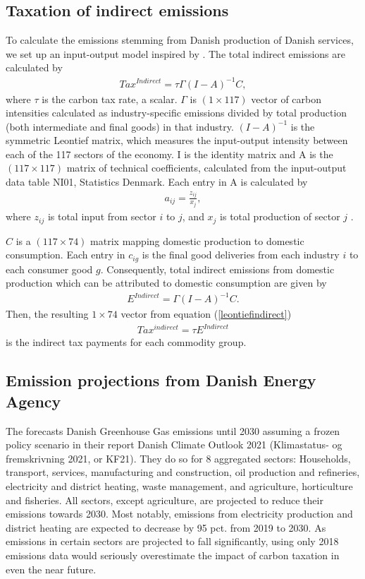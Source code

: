 \subsection{Taxation of indirect emissions}\label{secindirecttax}
To calculate the emissions stemming from Danish production of Danish services, we set up an input-output model inspired by \cite{Wier2005}. The total indirect emissions are calculated by 
\begin{align} 
\label{leontiefindirect}
    Tax^{Indirect} = \tau \Gamma (I-A)^{-1} C,
\end{align}
where $\tau$ is the carbon tax rate, a scalar. $\Gamma$ is $(1 \times 117)$ vector of carbon intensities calculated as industry-specific emissions divided by total production (both intermediate and final goods) in that industry.
$(I-A)^{-1}$ is the symmetric Leontief matrix, which measures the input-output intensity between each of the 117 sectors of the economy. I is the identity matrix and A is the $(117 \times 117)$ matrix of technical coefficients, calculated from the  input-output data table NI01, Statistics Denmark. Each entry in A is calculated by
\begin{align}
    a_{ij} = \frac{z_{ij}}{x_{j}}, 
\end{align}
where $z_{ij}$ is total input from sector $i$ to $j$, and $x_j$ is total production of sector $j$ \citep{miller_blair_2009}.

$C$ is a  $(117 \times 74)$  matrix mapping domestic production to domestic consumption. Each entry in $c_{ig}$ is the final good deliveries from each industry $i$ to each consumer good $g$. Consequently, total indirect emissions from domestic production which can be attributed to domestic consumption are given by
\begin{align}
    E^{Indirect} = \Gamma (I-A)^{-1} C.
\end{align}
Then, the resulting $1 \times 74$ vector from equation (\ref{leontiefindirect})
\begin{align}
   Tax^{indirect} = \tau E^{Indirect} 
\end{align}
is the indirect tax payments for each commodity group. 


\subsection{Emission projections from Danish Energy Agency}\label{sec:kf21fremskriv}
The \cite{kf21} forecasts Danish Greenhouse Gas emissions until 2030 assuming a frozen policy scenario in their report Danish Climate Outlook 2021 (Klimastatus- og fremskrivning 2021, or KF21). They do so for 8 aggregated sectors: Households, transport, services, manufacturing and construction, oil production and refineries, electricity and district heating, waste management, and agriculture, horticulture and fisheries. All sectors, except agriculture, are projected to reduce their emissions towards 2030. Most notably, emissions from electricity production and district heating are expected to decrease by 95 pct. from 2019 to 2030. As emissions in certain sectors are projected to fall significantly, using only 2018 emissions data would seriously overestimate the impact of carbon taxation in even the near future.

